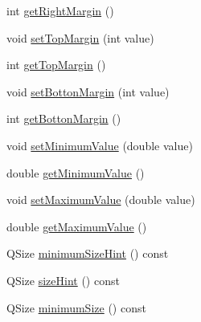 \begin{DoxyCompactItemize}
int \hyperlink{class_q_abstract_plotter_abc6cfa6675b3929584098e6caecc4653}{get\+Right\+Margin} ()
\item 
void \hyperlink{class_q_abstract_plotter_aa8123d9ff00fc90a16941dcc316eb681}{set\+Top\+Margin} (int value)
\item 
int \hyperlink{class_q_abstract_plotter_a433e57cc311fe2b5ce8355e1abeb8499}{get\+Top\+Margin} ()
\item 
void \hyperlink{class_q_abstract_plotter_a8f70db972215f18aeaa7bd7c9178c290}{set\+Botton\+Margin} (int value)
\item 
int \hyperlink{class_q_abstract_plotter_a1edbd105fa650b6d20464c8700aff86e}{get\+Botton\+Margin} ()
\item 
void \hyperlink{class_q_abstract_plotter_a1eb3b318f304bb12d8893d5286687ecc}{set\+Minimum\+Value} (double value)
\item 
double \hyperlink{class_q_abstract_plotter_aca30feb881045640dc626f7ac8b0e527}{get\+Minimum\+Value} ()
\item 
void \hyperlink{class_q_abstract_plotter_a04c958a32531d5d9c884d713e15b6cb0}{set\+Maximum\+Value} (double value)
\item 
double \hyperlink{class_q_abstract_plotter_a4dd579c2b55cbae07ebd1b4ecd8e9dae}{get\+Maximum\+Value} ()
\item 
Q\+Size \hyperlink{class_q_abstract_plotter_a509ffe6dd44286eb86b765e4aacce191}{minimum\+Size\+Hint} () const 
\item 
Q\+Size \hyperlink{class_q_abstract_plotter_a8bfe556438a69e71f11fd3d87abe35d4}{size\+Hint} () const 
\item 
Q\+Size \hyperlink{class_q_abstract_plotter_aec5c43ec5a155f2a5a248fd4543ee1b7}{minimum\+Size} () const 
\end{DoxyCompactItemize}
